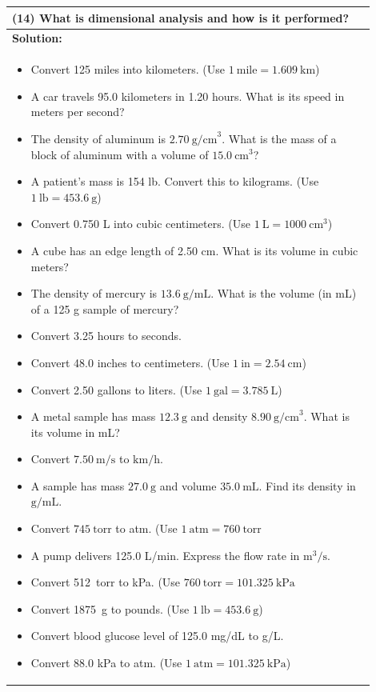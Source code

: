 \documentclass{article}
\begin{document}
\begin{tabular}{|p{0.9\linewidth}|}
\hline
\textbf{(14)} What is dimensional analysis and how is it performed? \\
\hline
\textbf{Solution:} \\
\begin{itemize}
    \item Convert 125 miles into kilometers. (Use $1~\text{mile} = 1.609~\text{km}$)
    \item A car travels 95.0 kilometers in 1.20 hours. What is its speed in meters per second?
    \item The density of aluminum is $2.70~\text{g/cm}^3$. What is the mass of a block of aluminum with a volume of $15.0~\text{cm}^3$?
    \item A patient’s mass is 154 lb. Convert this to kilograms. (Use $1~\text{lb} = 453.6~\text{g}$)
    \item Convert 0.750 L into cubic centimeters. (Use $1~\text{L} = 1000~\text{cm}^3$)
    \item A cube has an edge length of 2.50 cm. What is its volume in cubic meters?
    \item The density of mercury is $13.6~\text{g/mL}$. What is the volume (in mL) of a 125 g sample of mercury?
    \item Convert 3.25 hours to seconds.
    \item Convert 48.0 inches to centimeters. (Use $1~\text{in} = 2.54~\text{cm}$)
    \item Convert 2.50 gallons to liters. (Use $1~\text{gal} = 3.785~\text{L}$)
    \item A metal sample has mass $12.3~\text{g}$ and density $8.90~\text{g/cm}^3$. What is its volume in mL?
    \item Convert $7.50~\text{m/s}$ to $\text{km/h}$.
    \item A sample has mass $27.0~\text{g}$ and volume $35.0~\text{mL}$. Find its density in $\text{g/mL}$.
    \item Convert $745~\text{torr}$ to atm. (Use $1~\text{atm}=760~\text{torr}$
    \item A pump delivers 125.0 L/min. Express the flow rate in $\text{m}^3/\text{s}$.
    \item Convert 512~torr to kPa. (Use $760~\text{torr}=101.325~\text{kPa}$
    \item Convert 1875~g to pounds. (Use $1~\text{lb}=453.6~\text{g}$)
    \item Convert blood glucose level of 125.0 mg/dL to g/L.
    \item Convert 88.0 kPa to atm. (Use $1~\text{atm}=101.325~\text{kPa}$)

\end{itemize}
\end{tabular}
\end{document}
